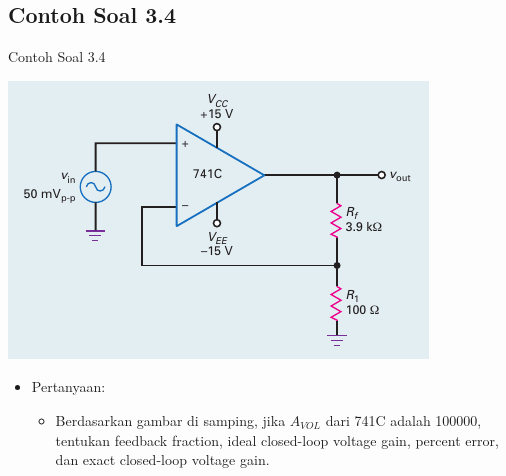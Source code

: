 \subsection{Contoh Soal 3.4}
\begin{frame}{Contoh Soal 3.4}
	\begin{multicols}{2}
		\begin{center}
			\includegraphics[width=1\linewidth]{gambar/fig-17.04}
		\end{center}
		\columnbreak
		\begin{itemize}
			\item Pertanyaan:
			\begin{itemize}
				\item Berdasarkan gambar di samping, jika $ A_{VOL} $ dari 741C adalah 100000, tentukan feedback fraction, ideal closed-loop voltage gain, percent error, dan exact closed-loop voltage gain.
			\end{itemize}
		\end{itemize}
	\end{multicols}
\end{frame}